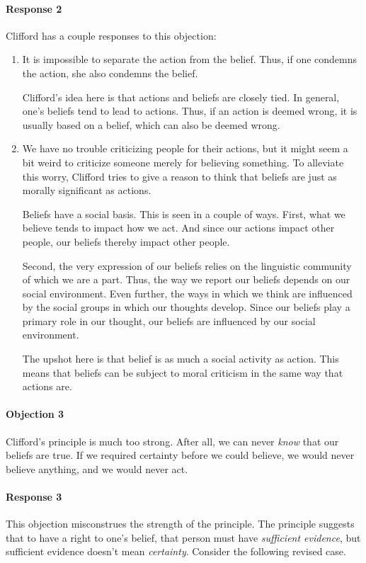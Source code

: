 \documentclass[letterpaper,10pt]{article}
\begin{document}
\paragraph{Response 2} Clifford has a couple responses to this objection:
\begin{enumerate}
 \item It is impossible to separate the action from the belief. Thus, if one condemns the action, she also condemns the belief.

 Clifford's idea here is that actions and beliefs are closely tied. In general, one's beliefs tend to lead to actions. Thus, if an action is deemed wrong, it is usually based on a belief, which can also be deemed wrong.

 \item We have no trouble criticizing people for their actions, but it might seem a bit weird to criticize someone merely for believing something. To alleviate this worry, Clifford tries to give a reason to think that beliefs are just as morally significant as actions.

 Beliefs have a social basis.  This is seen in a couple of ways.  First, what we believe tends to impact how we act.  And since our actions impact other people, our beliefs thereby impact other people.

 Second, the very expression of our beliefs relies on the linguistic community of which we are a part. Thus, the way we report our beliefs depends on our social environment.  Even further, the ways in which we think are influenced by the social groups in which our thoughts develop. Since our beliefs play a primary role in our thought, our beliefs are influenced by our social environment.

 The upshot here is that belief is as much a social activity as action. This means that beliefs can be subject to moral criticism in the same way that actions are.
\end{enumerate}

\paragraph{Objection 3} Clifford's principle is much too strong.  After all, we can never \textit{know} that our beliefs are true.  If we required certainty before we could believe, we would never believe anything, and we would never act.

\paragraph{Response 3} This objection misconstrues the strength of the principle. The principle suggests that to have a right to one's belief, that person must have \textit{sufficient evidence}, but sufficient evidence doesn't mean \textit{certainty}. Consider the following revised case.
\end{document}
